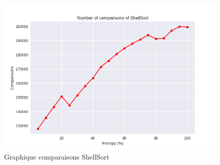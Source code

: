 \documentclass[10pt,a4paper]{article}
\begin{document}
            \begin{figure}
                \centering
                \includegraphics[width=1\textwidth]{graphique/ShellSort/GraphComparisonsShellSort.png}
                \caption{Graphique comparaisons ShellSort}
                \label{fig:mesh1}
            \end{figure}
\end{document}
